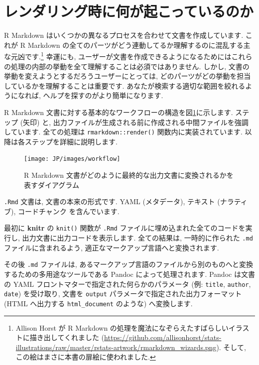 \documentclass[
  11pt,
  lualatex,ja=standard,jafont=noto]{bxjsreport}
\begin{document}
\hypertarget{rmarkdown-process}{%
\section{レンダリング時に何が起こっているのか}\label{rmarkdown-process}}

R Markdown はいくつかの異なるプロセスを合わせて文書を作成しています. これが R Markdown の全てのパーツがどう連動してるか理解するのに混乱する主な元凶です.\footnote{Allison Horst が R Markdown の処理を魔法になぞらえたすばらしいイラストに描き出してくれました (\url{https://github.com/allisonhorst/stats-illustrations/raw/master/rstats-artwork/rmarkdown_wizards.png}). そして, この絵はまさに本書の扉絵に使われました.} 幸運にも, ユーザーが文書を作成できるようになるためにはこれらの処理の内部の挙動を全て理解することは必須ではありません. しかし, 文書の挙動を変えようとするだろうユーザーにとっては, どのパーツがどの挙動を担当しているかを理解することは重要です. あなたが検索する適切な範囲を絞れるようになれば, ヘルプを探すのがより簡単になります.

R Markdown 文書に対する基本的なワークフローの構造を図\ref{fig:rmdworkflow}に示します. ステップ (矢印) と, 出力ファイルが生成される前に作成される中間ファイルを強調しています. 全ての処理は \texttt{rmarkdown::render()} 関数内に実装されています. 以降は各ステップを詳細に説明します.

\begin{figure}

{\centering \texttt{[image: JP/images/workflow]} 

}

\caption{R Markdown 文書がどのように最終的な出力文書に変換されるかを表すダイアグラム}\label{fig:rmdworkflow}
\end{figure}

\texttt{.Rmd} 文書は, 文書の本来の形式です. YAML (メタデータ), テキスト (ナラティブ), コードチャンク を含んでいます.

最初に \textbf{knitr} \autocite{R-knitr} の \texttt{knit()} 関数が \texttt{.Rmd} ファイルに埋め込まれた全てのコードを実行し, 出力文書に出力コードを表示します. 全ての結果は, 一時的に作られた \texttt{.md} ファイルに含まれるよう, 適正なマークアップ言語へと変換されます.

その後 \texttt{.md} ファイルは, あるマークアップ言語のファイルから別のものへと変換するための多用途なツールである Pandoc によって処理されます. Pandoc は文書の YAML フロントマターで指定された何らかのパラメータ (例: \texttt{title}, \texttt{author}, \texttt{date}) を受け取り, 文書を \texttt{output} パラメータで指定された出力フォーマット (HTML へ出力する \texttt{html\_document} のような) へ変換します.
\end{document}
